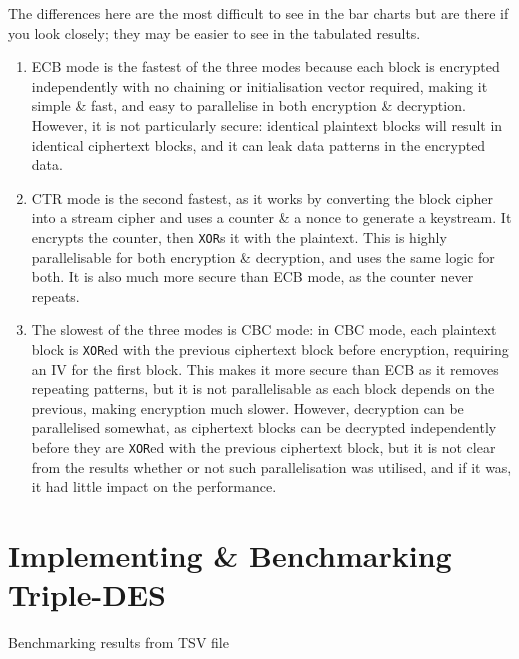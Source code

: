 \documentclass[a4paper]{article}
\begin{document}
The differences here are the most difficult to see in the bar charts but are there if you look closely; they may be easier to see in the tabulated results.
\begin{enumerate}
    \item   ECB mode is the fastest of the three modes because each block is encrypted independently with no chaining or initialisation vector required, making it simple \& fast, and easy to parallelise in both encryption \& decryption.
            However, it is not particularly secure: identical plaintext blocks will result in identical ciphertext blocks, and it can leak data patterns in the encrypted data.

    \item   CTR mode is the second fastest, as it works by converting the block cipher into a stream cipher and uses a counter \& a nonce to generate a keystream.
            It encrypts the counter, then \verb|XOR|s it with the plaintext.
            This is highly parallelisable for both encryption \& decryption, and uses the same logic for both.
            It is also much more secure than ECB mode, as the counter never repeats.

    \item   The slowest of the three modes is CBC mode:
            in CBC mode, each plaintext block is \verb|XOR|ed with the previous ciphertext block before encryption, requiring an IV for the first block.
            This makes it more secure than ECB as it removes repeating patterns, but it is not parallelisable as each block depends on the previous, making encryption much slower.
            However, decryption can be parallelised somewhat, as ciphertext blocks can be decrypted independently before they are \verb|XOR|ed with the previous ciphertext block, but it is not clear from the results whether or not such parallelisation was utilised, and if it was, it had little impact on the performance.
\end{enumerate}

\section{Implementing \& Benchmarking Triple-DES}
\begin{table}[H]
    \centering
    \caption{Benchmarking results from TSV file}
\end{table}
\end{document}
